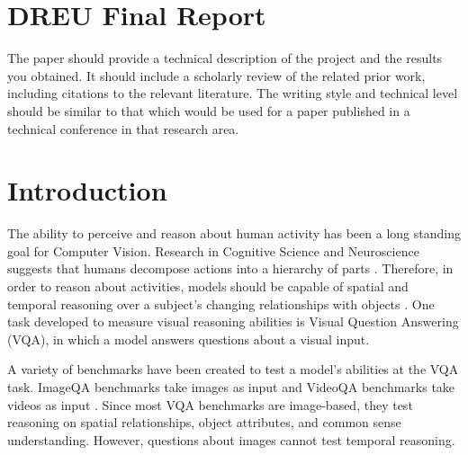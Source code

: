 \documentclass{article}
\newcommand{\mgm}[1]{{\color{cyan}{mgm: #1}}}
\begin{document}
\section*{DREU Final Report}

The paper should provide a technical description of the project and the results you obtained. It should include a scholarly review of the related prior work, including citations to the relevant literature. The writing style and technical level should be similar to that which would be used for a paper published in a technical conference in that research area.


\section{Introduction}


\mgm{High level comment: is this too much or too little detail for an intro? anything else we should include?}

The ability to perceive and reason about human activity has been a long standing goal for Computer Vision. Research in Cognitive Science and Neuroscience suggests that humans decompose actions into a hierarchy of parts \cite{zacks2001events}. Therefore, in order to reason about activities, models should be capable of spatial and temporal reasoning over a subject's changing relationships with objects \cite{ji2020action}. One task developed to measure visual reasoning abilities is Visual Question Answering (VQA), in which a model answers questions about a visual input. 

A variety of benchmarks have been created to test a model's abilities at the VQA task. ImageQA benchmarks take images as input \cite{johnson2017clevr, hudson2019gqa, antol2015vqa, zellers2019recognition, goyal2017making, krishna2017visual, zhu2016visual7w, kim2020answering} and VideoQA benchmarks take videos as input \cite{tapaswi2016movieqa, lei2018tvqa, jang2017tgif, kim2017deepstory, xu2017video, maharaj2017dataset, zeng2016leveraging, yu2019activitynet}. Since most VQA benchmarks are image-based, they test reasoning on spatial relationships, object attributes, and common sense understanding. However, questions about images cannot test temporal reasoning. 
\end{document}
